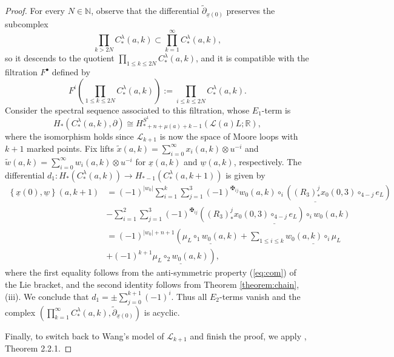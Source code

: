 \documentclass[a4paper]{article}
\numberwithin{equation}{section}
\begin{document}
\begin{proof}
For every $N\in\mathbb{N}$, observe that the differential $\tilde{\partial}_{\underline{x}(0)}$ preserves the subcomplex
\begin{equation}
\prod_{k>2N}C_\ast^\lambda(a,k)\subset\prod_{k=1}^\infty C_\ast^\lambda(a,k), 
\end{equation} 
so it descends to the quotient $\prod_{1\leq k\leq2N}C_\ast^\lambda(a,k)$, and it is compatible with the filtration $F^\bullet$ defined by
\begin{equation}
F^i\left(\prod_{1\leq k\leq2N}C_\ast^\lambda(a,k)\right):=\prod_{i\leq k\leq2N}C_\ast^\lambda(a,k).
\end{equation}
Consider the spectral sequence associated to this filtration, whose $E_1$-term is
\begin{equation}
H_\ast\left(C_\ast^\lambda(a,k),\partial\right)\cong H_{\ast+n+\mu(a)+k-1}^{S^1}(\mathcal{L}(a)L;\mathbb{R}),
\end{equation}
where the isomorphism holds since $\mathcal{L}_{k+1}$ is now the space of Moore loops with $k+1$ marked points. Fix lifts $\tilde{x}(a,k)=\sum_{i=0}^\infty x_i(a,k)\otimes u^{-i}$ and $\tilde{w}(a,k)=\sum_{i=0}^\infty w_i(a,k)\otimes u^{-i}$ for $\underline{x}(a,k)$ and $\underline{w}(a,k)$, respectively. The differential $d_1:H_\ast\left(C_\ast^\lambda(a,k)\right)\rightarrow H_{\ast-1}\left(C_\ast^\lambda(a,k+1)\right)$ is given by
\begin{equation}
	\begin{split}
    \left\{\underline{x}(0),\underline{w}\right\}(a,k+1)&=(-1)^{|w_0|}\sum_{i=1}^k\sum_{j=1}^3(-1)^{\maltese_{ij}}\underline{w_0(a,k)\circ_i\left((R_3)_\ast^jx_0(0,3)\circ_{4-j}e_L\right)} \\
    &-\sum_{i=1}^2\sum_{j=1}^3(-1)^{\maltese_{ij}}\underline{\left((R_3)_\ast^jx_0(0,3)\circ_{4-j}e_L\right)\circ_iw_0(a,k)} \\
    &=(-1)^{|w_0|+n+1}\left(\underline{\mu_L\circ_1w_0(a,k)}+\sum_{1\leq i\leq k}\underline{w_0(a,k)\circ_i\mu_L}\right. \\
    &\left.+(-1)^{k+1}\underline{\mu_L\circ_2w_0(a,k)}\right),
    \end{split}
\end{equation}
where the first equality follows from the anti-symmetric property (\ref{eq:com}) of the Lie bracket, and the second identity follows from Theorem \ref{theorem:chain}, (iii). We conclude that $d_1=\pm\sum_{j=0}^{k+1}(-1)^i$. Thus all $E_2$-terms vanish and the complex $\left(\prod_{k=1}^\infty C_\ast^\lambda(a,k),\tilde{\partial}_{\underline{x}(0)}\right)$ is acyclic.

Finally, to switch back to Wang's model of $\mathcal{L}_{k+1}$ and finish the proof, we apply \cite{ywt}, Theorem 2.2.1.
\end{proof}
\end{document}
